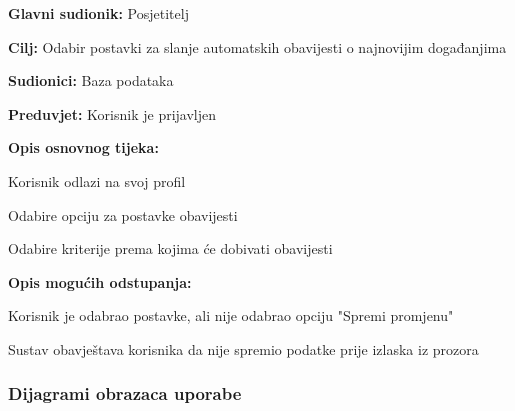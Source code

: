 				\noindent {}
				\begin{packed_item}
					
					\item \textbf{Glavni sudionik: }Posjetitelj
					\item  \textbf{Cilj:} Odabir postavki za slanje automatskih obavijesti o najnovijim događanjima
					\item  \textbf{Sudionici:} Baza podataka
					\item  \textbf{Preduvjet:} Korisnik je prijavljen
					\item  \textbf{Opis osnovnog tijeka:}
					
					\item[] \begin{packed_enum}
						\item Korisnik odlazi na svoj profil
						\item Odabire opciju za postavke obavijesti
						\item Odabire kriterije prema kojima će dobivati obavijesti
					\end{packed_enum}
					
					\item  \textbf{Opis mogućih odstupanja:}
					
					\begin{packed_item}
						
						\item[3.a] Korisnik je odabrao postavke, ali nije odabrao opciju "Spremi promjenu"
						\item[] \begin{packed_enum}
							
							\item Sustav obavještava korisnika da nije spremio podatke prije izlaska iz prozora
							
						\end{packed_enum}
					\end{packed_item}
				\end{packed_item}
					
			
				
				
				\subsubsection{Dijagrami obrazaca uporabe}
					
